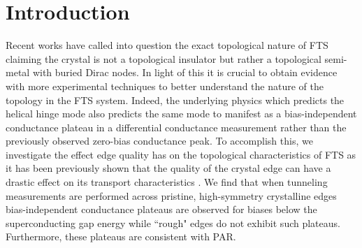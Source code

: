 \section{Introduction}
Recent works have called into question the exact topological nature of \ac{FTS} claiming the crystal is not a topological insulator but rather a topological semi-metal with buried Dirac nodes. In light of this it is crucial to obtain evidence with more experimental techniques to better understand the nature of the topology in the \ac{FTS} system. Indeed, the underlying physics which predicts the helical hinge mode also predicts the same mode to manifest as a bias-independent conductance plateau in a differential conductance measurement rather than the previously observed zero-bias conductance peak. To accomplish this, we investigate the effect edge quality has on the topological characteristics of \ac{FTS} as it has been previously shown that the quality of the crystal edge can have a drastic effect on its transport characteristics . We find that when tunneling measurements are performed across pristine, high-symmetry crystalline edges bias-independent conductance plateaus are observed for biases below the superconducting gap energy while ``rough" edges do not exhibit such plateaus. Furthermore, these plateaus are consistent with \acl{PAR}.


